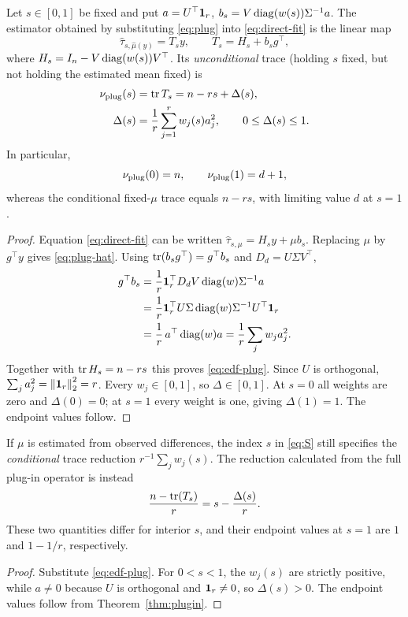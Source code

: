 \begin{theorem}\label{thm:plugin}
Let $s\in[0,1]$ be fixed and put
$a=U^\top\mathbf 1_r$,
$b_s=V\operatorname{diag}(w(s))\Sigma^{-1}a$.
The estimator obtained by substituting \eqref{eq:plug} into
\eqref{eq:direct-fit} is the linear map
\begin{equation}\label{eq:plug-hat}
\widehat\tau_{s,\widehat\mu(y)}
=T_sy,\qquad
T_s=H_s+b_sg^\top,
\end{equation}
where $H_s=I_n-V\operatorname{diag}(w(s))V^\top$.
Its \emph{unconditional} trace (holding $s$ fixed, but
not holding the estimated mean fixed) is
\begin{equation}\label{eq:edf-plug}
\begin{aligned}
\nu_{\rm plug}(s)&=\operatorname{tr} T_s
=n-rs+\Delta(s),\\
\Delta(s)&=\frac1r\sum_{j=1}^r w_j(s)a_j^2,
\qquad 0\le\Delta(s)\le1.
\end{aligned}
\end{equation}
In particular,
\[
\nu_{\rm plug}(0)=n,\qquad
\nu_{\rm plug}(1)=d+1,
\]
whereas the conditional fixed-$\mu$ trace equals $n-rs$,
with limiting value $d$ at $s=1$.
\end{theorem}
\begin{proof}
Equation \eqref{eq:direct-fit} can be written
$\widehat\tau_{s,\mu}=H_sy+\mu b_s$.
Replacing $\mu$ by $g^\top y$ gives \eqref{eq:plug-hat}.
Using $\operatorname{tr}(b_sg^\top)=g^\top b_s$ and
$D_d=U\Sigma V^\top$,
\[
\begin{aligned}
g^\top b_s
&=\frac1r\mathbf 1_r^\top D_dV\operatorname{diag}(w)\Sigma^{-1}a\\
&=\frac1r\mathbf 1_r^\top U\Sigma\operatorname{diag}(w)\Sigma^{-1}U^\top\mathbf 1_r\\
&=\frac1r\,a^\top\operatorname{diag}(w)a
=\frac1r\sum_jw_ja_j^2.
\end{aligned}
\]
Together with $\operatorname{tr} H_s=n-rs$ this proves
\eqref{eq:edf-plug}. Since $U$ is orthogonal,
$\sum_j a_j^2=\left\lVert\mathbf 1_r\right\rVert_2^2=r$.
Every $w_j\in[0,1]$, so $\Delta\in[0,1]$.
At $s=0$ all weights are zero and
$\Delta(0)=0$; at $s=1$ every weight is one,
giving $\Delta(1)=1$. The endpoint
values follow.
\end{proof}

\begin{corollary}\label{cor:edf}
If $\mu$ is estimated from observed differences, the index $s$
in \eqref{eq:S} still specifies the \emph{conditional} trace
reduction $r^{-1}\sum_jw_j(s)$. The reduction calculated from
the full plug-in operator is instead
\[
\frac{n-\operatorname{tr}(T_s)}r=s-\frac{\Delta(s)}r.
\]
These two quantities differ for interior $s$, and their endpoint
values at $s=1$ are $1$ and $1-1/r$, respectively.
\end{corollary}
\begin{proof}
Substitute \eqref{eq:edf-plug}. For $0<s<1$, the
$w_j(s)$ are strictly positive, while $a\ne0$ because
$U$ is orthogonal and $\mathbf 1_r\ne0$, so $\Delta(s)>0$.
The endpoint values follow from Theorem~\ref{thm:plugin}.
\end{proof}

